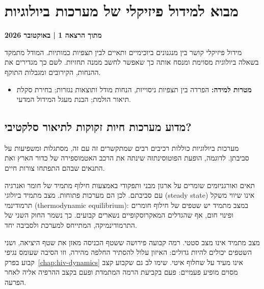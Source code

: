 
\chapter{מבוא למידול פיזיקלי של מערכות ביולוגיות}\label{chap:mavo}
\noindent\textbf{מתוך הרצאה 1 \enspace| באוקטובר 2026}

\vspace{0.5em}
מידול פיזיקלי קושר בין מנגנונים ביוכימיים ותאיים לבין תצפיות כמותיות. המודל מתמקד בשאלה ביולוגית מסוימת ומנסח אותה כך שאפשר לחשב ממנה תחזיות. לשם כך מגדירים את ההנחות, הקירובים ומגבלות התוקף.

\begin{itemize}[nosep]
\item \textbf{מטרות למידה:} הפרדה בין תצפיות ניסוייות, הנחות מודל ותוצאות נגזרות; בחירת סקלת תיאור הולמת; הבנת מעגל המידול המדעי.
\end{itemize}

\section{מדוע מערכות חיות זקוקות לתיאור סלקטיבי?}\label{sec:mavo-complexity}
מערכות ביולוגיות כוללות רכיבים רבים שמתקשרים זה עם זה, מסתגלות ומשפיעות על סביבתן. לדוגמה, הופעת הפוטוסינתזה שינתה את הרכב האטמוספירה של כדור הארץ ואת התנאים שבהם התפתחו צורות חיים.

תאים ואורגניזמים שומרים על ארגון מבני ותפקודי באמצעות חילוף מתמיד של חומר ואנרגיה עם סביבתם. לכן הם מערכות פתוחות. מצב מתמיד ביולוגי (\textenglish{steady state}) אינו שיווי משקל תרמודינמי (\textenglish{thermodynamic equilibrium}): במצב מתמיד יש שטפים של חילוף חומרים ופינוי חום, אף שהגדלים המאקרוסקופיים נשארים קבועים. כך נשמר החוק השני של התרמודינמיקה, המתייחס למערכת ולסביבה יחד.

\begin{remark}
מצב מתמיד אינו מצב סטטי. רמה קבועה פירושה ששטף הכניסה מאזן את שטף היציאה, ושני השטפים יכולים להיות גדולים: האיזון עלול להסתיר החלפה מהירה, וזו הסיבה שעומס נגיפי קבוע בפרק~\ref{chap:hiv-dynamics} אינו מעיד על שחלוף איטי. שימו לב גם שקבוע קצב מסוים מופיע פעמיים: פעם בקביעת הרמה המתמדת ופעם בקצב ההרפיה אליה לאחר הפרעה.
\end{remark}

